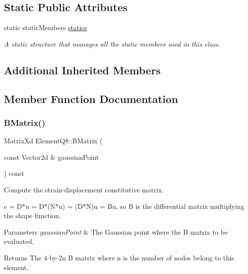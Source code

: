 \subsection*{Static Public Attributes}
\begin{DoxyCompactItemize}
\item 
\mbox{\label{class_element_q8_a62510ae2d4322be38825928a1f0e2747}} 
static static\+Members \mbox{\hyperlink{class_element_q8_a62510ae2d4322be38825928a1f0e2747}{statics}}
\begin{DoxyCompactList}\small\item\em A static structure that manages all the static members used in this class. \end{DoxyCompactList}\end{DoxyCompactItemize}
\subsection*{Additional Inherited Members}


\subsection{Member Function Documentation}
\mbox{\label{class_element_q8_afb41facf96d5bb4be5162724699e3e02}} 
\subsubsection{\texorpdfstring{B\+Matrix()}{BMatrix()}}
{\footnotesize\ttfamily Matrix\+Xd Element\+Q8\+::\+B\+Matrix (\begin{DoxyParamCaption}\item[{const Vector2d \&}]{gaussian\+Point }\end{DoxyParamCaption}) const\hspace{0.3cm}{\ttfamily [virtual]}}



Compute the strain-\/displacement constitutive matrix. 

e = D$\ast$u = D$\ast$(N$\ast$u) = (D$\ast$N)u = Bu, so B is the differential matrix multiplying the shape function.


\begin{DoxyParams}{Parameters}
{\em gaussian\+Point} & The Gaussian point where the B matrix to be evaluated. \\
\hline
\end{DoxyParams}
\begin{DoxyReturn}{Returns}
The 4-\/by-\/2n B matrix where n is the number of nodes belong to this element. 
\end{DoxyReturn}


